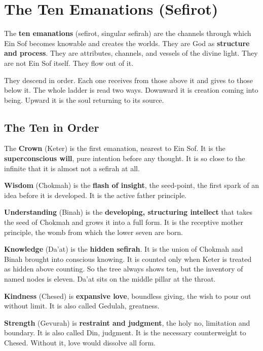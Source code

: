 \section{The Ten Emanations (Sefirot)}

The \textbf{ten emanations} (sefirot, singular sefirah) are the channels through which Ein Sof becomes
knowable and creates the worlds. They are God as \textbf{structure and process}. They are attributes,
channels, and vessels of the divine light. They are not Ein Sof itself. They flow out of it.

They descend in order. Each one receives from those above it and gives to those below it. The whole
ladder is read two ways. Downward it is creation coming into being. Upward it is the soul returning to
its source.

\subsection{The Ten in Order}

The \textbf{Crown} (Keter) is the first emanation, nearest to Ein Sof. It is the \textbf{superconscious
will}, pure intention before any thought. It is so close to the infinite that it is almost not a
sefirah at all.

\textbf{Wisdom} (Chokmah) is the \textbf{flash of insight}, the seed-point, the first spark of an idea
before it is developed. It is the active father principle.

\textbf{Understanding} (Binah) is the \textbf{developing, structuring intellect} that takes the seed of
Chokmah and grows it into a full form. It is the receptive mother principle, the womb from which the
lower seven are born.

\textbf{Knowledge} (Da'at) is the \textbf{hidden sefirah}. It is the union of Chokmah and Binah brought
into conscious knowing. It is counted only when Keter is treated as hidden above counting. So the tree
always shows ten, but the inventory of named nodes is eleven. Da'at sits on the middle pillar at the
throat.

\textbf{Kindness} (Chesed) is \textbf{expansive love}, boundless giving, the wish to pour out without
limit. It is also called Gedulah, greatness.

\textbf{Strength} (Gevurah) is \textbf{restraint and judgment}, the holy no, limitation and boundary.
It is also called Din, judgment. It is the necessary counterweight to Chesed. Without it, love would
dissolve all form.

